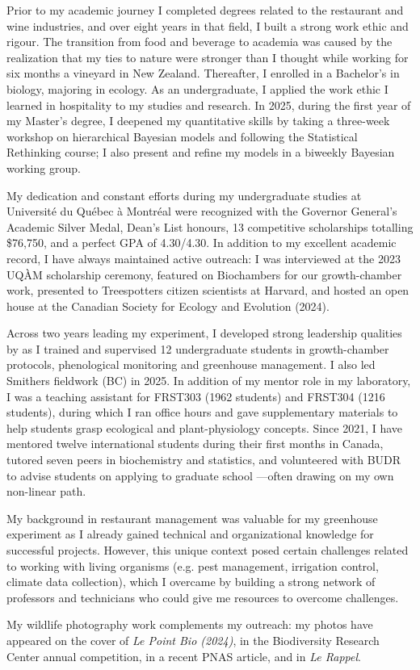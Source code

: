 \documentclass[12pt]{article}
\begin{document}
Prior to my academic journey I completed degrees related to the restaurant and wine industries, and over eight years in that field, I built a strong work ethic and rigour. The transition from food and beverage to academia was caused by the realization that my ties to nature were stronger than I thought while working for six months a vineyard in New Zealand. Thereafter, I enrolled in a Bachelor's in biology, majoring in ecology. As an undergraduate, I applied the work ethic I learned in hospitality to my studies and research. In 2025, during the first year of my Master's degree, I deepened my quantitative skills by taking a three-week workshop on hierarchical Bayesian models and following the Statistical Rethinking course; I also present and refine my models in a biweekly Bayesian working group.

My dedication and constant efforts during my undergraduate studies at Université du Québec à Montréal were recognized with the Governor General's Academic Silver Medal, Dean's List honours, 13 competitive scholarships totalling \$76,750, and a perfect GPA of 4.30/4.30. In addition to my excellent academic record, I have always maintained active outreach: I was interviewed at the 2023 UQÀM scholarship ceremony, featured on Biochambers for our growth-chamber work, presented to Treespotters citizen scientists at Harvard, and hosted an open house at the Canadian Society for Ecology and Evolution (2024).

Across two years leading my experiment, I developed strong leadership qualities by as I trained and supervised 12 undergraduate students in growth-chamber protocols, phenological monitoring and greenhouse management. I also led Smithers fieldwork (BC) in 2025. In addition of my mentor role in my laboratory, I was a teaching assistant for FRST303 (1962 students) and FRST304 (1216 students), during which I ran office hours and gave supplementary materials to help students grasp ecological and plant-physiology concepts. Since 2021, I have mentored twelve international students during their first months in Canada, tutored seven peers in biochemistry and statistics, and volunteered with BUDR to advise students on applying to graduate school ---often drawing on my own non-linear path.

My background in restaurant management was valuable for my greenhouse experiment as I already gained technical and organizational knowledge for successful projects. However, this unique context posed certain challenges related to working with living organisms (e.g. pest management, irrigation control, climate data collection), which I overcame by building a strong network of professors and technicians who could give me resources to overcome challenges.


My wildlife photography work complements my outreach: my photos have appeared on the cover of \textit{Le Point Bio (2024)}, in the Biodiversity Research Center annual competition, in a recent PNAS article, and in \textit{Le Rappel}.
\end{document}
